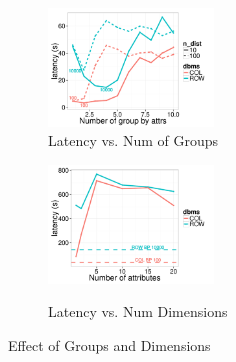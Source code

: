 \begin{figure}[h]
	\centering
	\vspace*{-10pt}
	\begin{subfigure}{0.48\linewidth}
		\centering
		\includegraphics[width=4.4cm] {Images/multi_gb_same.pdf}
		\vspace{-15pt}
		\caption{Latency vs. Num of Groups}
		\label{fig:multi_gb_same}
	\end{subfigure}
	\begin{subfigure}{0.48\linewidth}
		\centering
		\includegraphics[width=4.4cm] {Images/multi_gb.pdf}\
		\vspace{-15pt}
		\caption{Latency vs. Num Dimensions}
		\label{fig:multi_gb_bp}
	\end{subfigure}
	\vspace{-10pt}
	\caption{Effect of Groups and Dimensions}
	\vspace{-10pt}
\end{figure}





